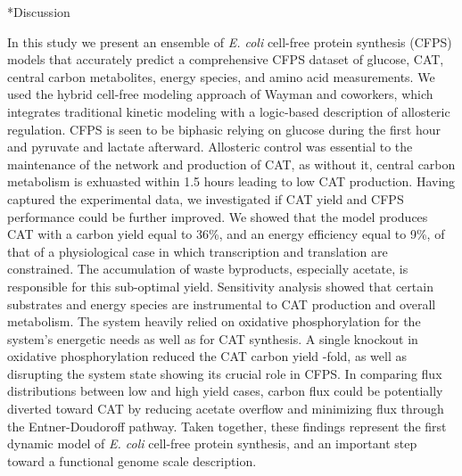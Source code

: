 \documentclass[12pt]{article}
\makeatletter
\renewcommand\section{\@startsection
	{subsection}{2}{0mm}
	{-0.2in}
	{0.05\baselineskip}
	{\normalfont\large\bfseries}}
\makeatother
\begin{document}
\clearpage

\section*{Discussion}


In this study we present an ensemble of \textit{E. coli} cell-free protein synthesis (CFPS) models that accurately predict a comprehensive CFPS dataset of glucose, CAT, central carbon metabolites, energy species, and amino acid measurements.
We used the hybrid cell-free modeling approach of Wayman and coworkers, which integrates traditional kinetic modeling with a logic-based description of allosteric regulation.
CFPS is seen to be biphasic relying on glucose during the first hour and pyruvate and lactate afterward.
Allosteric control was essential to the maintenance of the network and production of CAT, as without it, central carbon metabolism is exhuasted within 1.5 hours leading to low CAT production.
Having captured the experimental data, we investigated if CAT yield and CFPS performance could be further improved.
We showed that the model produces CAT with a carbon yield equal to 36\%, and an energy efficiency equal to 9\%, of that of a physiological case in which transcription and translation are constrained.
The accumulation of waste byproducts, especially acetate, is responsible for this sub-optimal yield.
Sensitivity analysis showed that certain substrates and energy species are instrumental to CAT production and overall metabolism.
The system heavily relied on oxidative phosphorylation for the system's energetic needs as well as for CAT synthesis.
A single knockout in oxidative phosphorylation reduced the CAT carbon yield -fold, as well as disrupting the system state showing its crucial role in CFPS.
In comparing flux distributions between low and high yield cases, carbon flux could be potentially diverted toward CAT by reducing acetate overflow and minimizing flux through the Entner-Doudoroff pathway.
Taken together, these findings represent the first dynamic model of \textit{E. coli} cell-free protein synthesis, and an important step toward a functional genome scale description.
\end{document}
